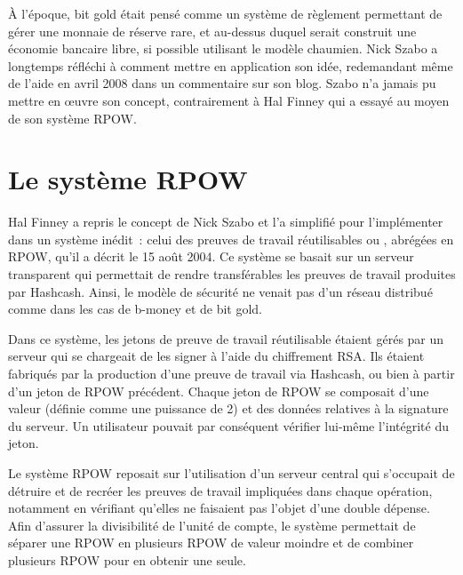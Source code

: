 À l'époque, bit gold était pensé comme un système de règlement permettant de gérer une monnaie de réserve rare, et au-dessus duquel serait construit une économie bancaire libre, si possible utilisant le modèle chaumien. Nick Szabo a longtemps réfléchi à comment mettre en application son idée, redemandant même de l'aide en avril 2008 dans un commentaire sur son blog. Szabo n'a jamais pu mettre en œuvre son concept, contrairement à Hal Finney qui a essayé au moyen de son système RPOW.

\section*{Le système RPOW} %

Hal Finney a repris le concept de Nick Szabo et l'a simplifié pour l'implémenter dans un système inédit~: celui des preuves de travail réutilisables ou , abrégées en RPOW, qu'il a décrit le 15 août 2004. Ce système se basait sur un serveur transparent qui permettait de rendre transférables les preuves de travail produites par Hashcash. Ainsi, le modèle de sécurité ne venait pas d'un réseau distribué comme dans les cas de b-money et de bit gold.

Dans ce système, les jetons de preuve de travail réutilisable étaient gérés par un serveur qui se chargeait de les signer à l'aide du chiffrement RSA. Ils étaient fabriqués par la production d'une preuve de travail via Hashcash, ou bien à partir d'un jeton de RPOW précédent. Chaque jeton de RPOW se composait d'une valeur (définie comme une puissance de 2) et des données relatives à la signature du serveur. Un utilisateur pouvait par conséquent vérifier lui-même l'intégrité du jeton.

Le système RPOW reposait sur l'utilisation d'un serveur central qui s'occupait de détruire et de recréer les preuves de travail impliquées dans chaque opération, notamment en vérifiant qu'elles ne faisaient pas l'objet d'une double dépense. Afin d'assurer la divisibilité de l'unité de compte, le système permettait de séparer une RPOW en plusieurs RPOW de valeur moindre et de combiner plusieurs RPOW pour en obtenir une seule.

